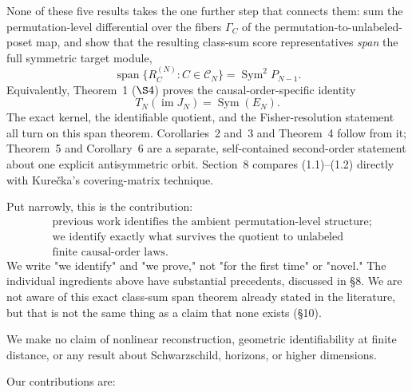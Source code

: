 \documentclass[11pt]{article}
\begin{document}
None of these five results takes the one further step that connects them: sum the permutation-level differential over the fibers $\Gamma_C$ of the permutation-to-unlabeled-poset map, and show that the resulting class-sum score representatives \emph{span} the full symmetric target module, \[ \operatorname{span}\{R_C^{(N)}:C\in\mathcal C_N\} =\operatorname{Sym}^2P_{N-1}. \] Equivalently, Theorem~1 ($\S4$) proves the causal-order-specific identity
\[
\boxed{T_N(\operatorname{im}J_N)=\operatorname{Sym}(E_N).}
\tag{1.2}
\]
The exact kernel, the identifiable quotient, and the Fisher-resolution statement all turn on this span theorem. Corollaries~2 and~3 and Theorem~4 follow from it; Theorem~5 and Corollary~6 are a separate, self-contained second-order statement about one explicit antisymmetric orbit. Section~8 compares (1.1)--(1.2) directly with Kure\v{c}ka's covering-matrix technique.

Put narrowly, this is the contribution: \[ \boxed{\begin{aligned} &\text{previous work identifies the ambient permutation-level structure;}\\ &\text{we identify exactly what survives the quotient to unlabeled}\\ &\text{finite causal-order laws.} \end{aligned}} \] We write "we identify" and "we prove," not "for the first time" or "novel." The individual ingredients above have substantial precedents, discussed in \S8. We are not aware of this exact class-sum span theorem already stated in the literature, but that is not the same thing as a claim that none exists (\S10).

We make no claim of nonlinear reconstruction, geometric identifiability at finite distance, or any result about Schwarzschild, horizons, or higher dimensions.

Our contributions are:
\end{document}
